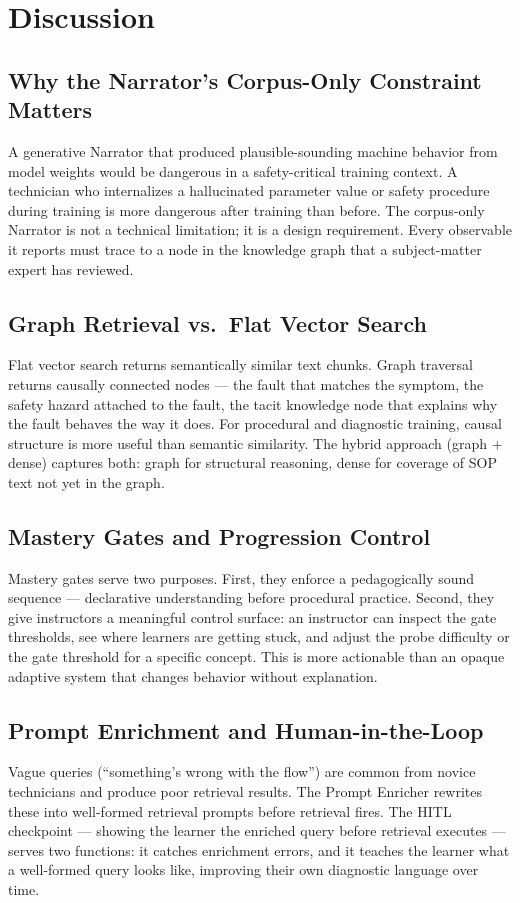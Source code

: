 \documentclass[10pt,letterpaper,twocolumn]{article}
\begin{document}
\section{Discussion}
\label{sec:discussion}

\subsection{Why the Narrator's Corpus-Only Constraint Matters}
A generative Narrator that produced plausible-sounding machine behavior from model weights would be dangerous in a safety-critical training context. A technician who internalizes a hallucinated parameter value or safety procedure during training is more dangerous after training than before. The corpus-only Narrator is not a technical limitation; it is a design requirement. Every observable it reports must trace to a node in the knowledge graph that a subject-matter expert has reviewed.

\subsection{Graph Retrieval vs.\ Flat Vector Search}
Flat vector search returns semantically similar text chunks. Graph traversal returns causally connected nodes --- the fault that matches the symptom, the safety hazard attached to the fault, the tacit knowledge node that explains why the fault behaves the way it does. For procedural and diagnostic training, causal structure is more useful than semantic similarity. The hybrid approach (graph + dense) captures both: graph for structural reasoning, dense for coverage of SOP text not yet in the graph.

\subsection{Mastery Gates and Progression Control}
Mastery gates serve two purposes. First, they enforce a pedagogically sound sequence --- declarative understanding before procedural practice. Second, they give instructors a meaningful control surface: an instructor can inspect the gate thresholds, see where learners are getting stuck, and adjust the probe difficulty or the gate threshold for a specific concept. This is more actionable than an opaque adaptive system that changes behavior without explanation.

\subsection{Prompt Enrichment and Human-in-the-Loop}
Vague queries (``something's wrong with the flow'') are common from novice technicians and produce poor retrieval results. The Prompt Enricher rewrites these into well-formed retrieval prompts before retrieval fires. The HITL checkpoint --- showing the learner the enriched query before retrieval executes --- serves two functions: it catches enrichment errors, and it teaches the learner what a well-formed query looks like, improving their own diagnostic language over time.
\end{document}
